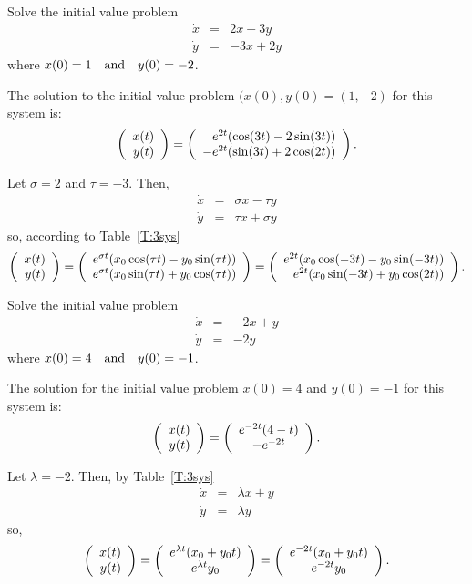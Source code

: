 \documentclass{ximera}
\begin{document}
\begin{exercise} \label{c6.3.1}
Solve the initial value problem
\[
\begin{array}{rcr}
\dot{x} & = & 2x + 3y \\
\dot{y} & = & -3x + 2y
\end{array}
\]
where $x(0) = 1  \quad\mbox{and}\quad  y(0) = -2$.

\begin{solution}

\ans The solution to the initial value problem $(x(0),y(0) = (1,-2)$ for
this system is:
\[
\left(\begin{array}{r} x(t) \\ y(t)\end{array}\right) = \left(\begin{array}{r} e^{2t}(\cos(3t) - 2\sin(3t)) \\ -e^{2t}(\sin(3t) + 2\cos(2t))\end{array}\right).
\]

\soln Let $\sigma = 2$ and $\tau = -3$.  Then,
\[
\begin{array}{rrr}
\dot{x} & = & \sigma x - \tau y \\
\dot{y} & = & \tau x + \sigma y \end{array}
\]
so, according to Table~\ref{T:3sys}
\[
\left(\begin{array}{r} x(t) \\ y(t)\end{array}\right) = \left(\begin{array}{r} e^{\sigma t}(x_0\cos(\tau t) -
y_0\sin(\tau t)) \\ e^{\sigma t}(x_0\sin(\tau t) +
y_0\cos(\tau t))\end{array}\right) = \left(\begin{array}{r} e^{2t}(x_0\cos(-3t) - y_0\sin(-3t)) \\ e^{2t}(x_0\sin(-3t) + y_0\cos(2t))\end{array}\right).
\]

\end{solution}
\end{exercise}

\begin{exercise} \label{c6.3.2}
Solve the initial value problem
\[
\begin{array}{rcr}
\dot{x} & = & -2x + y \\
\dot{y} & = & -2y
\end{array}
\]
where $x(0) = 4  \quad\mbox{and}\quad y(0) = -1$.

\begin{solution}

\ans The solution for the initial value problem $x(0) = 4$ and
$y(0) = -1$ for this system is:
\[
\left(\begin{array}{r} x(t) \\ y(t)\end{array}\right) = \left(\begin{array}{c} e^{-2t}(4 - t) \\ -e^{-2t}\end{array}\right).
\]

\soln Let $\lambda = -2$.  Then, by Table~\ref{T:3sys}
\[
\begin{array}{rrr}
\dot{x} & = & \lambda x + y \\
\dot{y} & = & \lambda y \end{array}
\]
so, 
\[
\left(\begin{array}{r} x(t) \\ y(t)\end{array}\right) = \left(\begin{array}{c} e^{\lambda t}(x_0 + y_0t) \\ e^{\lambda t}y_0\end{array}\right)
= \left(\begin{array}{c} e^{-2t}(x_0 + y_0t) \\ e^{-2t}y_0\end{array}\right).
\]

\end{solution}
\end{exercise}
\end{document}
